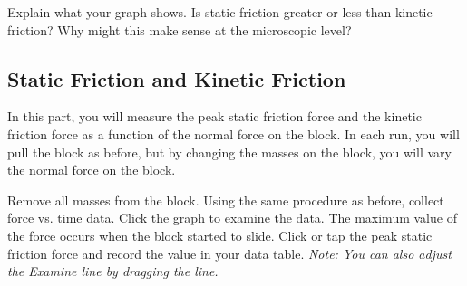 \documentclass[10pt]{exam}
\begin{document}
\begin{questions}




\question
  Explain what your graph shows.  Is static friction greater or less than kinetic friction?  Why might this make sense at the microscopic level?
  \fillwithdottedlines{15em}
  

\begin{EnvUplevel}
  \section{Static Friction and Kinetic Friction}

  In this part, you will measure the peak static friction force and the kinetic friction force as a function of the normal force on the block. In each run, you will pull the block as before, but by changing the masses on the block, you will vary the normal force on the block. 
\end{EnvUplevel}

\question 
  Remove all masses from the block.
\question
	Using the same procedure as before, collect force vs. time data.
\question
  Click the graph to examine the data. The maximum value of the force occurs when the block started to slide. Click or tap the peak static friction force and record the value in your data table. \emph{Note: You can also adjust the Examine line by dragging the line.}


\end{questions}
\end{document}
